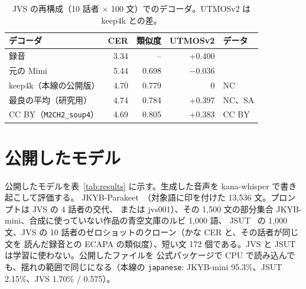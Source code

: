 \documentclass[10pt,a4paper,twocolumn]{article}
\begin{document}
\begin{table}[t]
\centering\footnotesize\setlength{\tabcolsep}{3pt}
\caption{JVS の再構成（10 話者 $\times$ 100 文）でのデコーダ。UTMOSv2 は keep4k との差。}
\label{tab:decoder}
\begin{tabular}{@{}lrrrl@{}}
\toprule
デコーダ & CER & 類似度 & UTMOSv2 & データ\\
\midrule
録音 & 3.34 & -- & +0.400 &\\
元の Mimi & 5.44 & 0.698 & $-0.036$ &\\
keep4k（本線の公開版） & 4.70 & 0.779 & 0 & NC\\
最良の平均（研究用） & 4.74 & 0.784 & +0.397 & NC、SA\\
CC BY（\texttt{M2CH2\_soup4}） & 4.69 & 0.805 & +0.383 & CC BY\\
\bottomrule
\end{tabular}
\end{table}

\section{公開したモデル}\label{sec:results}
公開したモデルを表~\ref{tab:results} に示す。生成した音声を kana-whisper で書き起こして評価する。
JKYB-Parakeet~\cite{jkyb,jkybp}（対象語に印を付けた 13,536 文。プロンプトは JVS の 4 話者の交代、
または jvs001）、その 1,500 文の部分集合 JKYB-mini、合成に使っていない作品の青空文庫のルビ 1,000 語、
JSUT~\cite{jsut} の 1,000 文、JVS の 10 話者のゼロショットのクローン（かな CER と、その話者が同じ文を
読んだ録音との ECAPA の類似度）、短い文 172 個である。JVS と JSUT は学習に使わない。公開したファイルを
公式パッケージで CPU で読み込んでも、揺れの範囲で同じになる（本線の \texttt{japanese}: JKYB-mini
95.3\%、JSUT 2.15\%、JVS 1.70\% / 0.575）。
\end{document}
